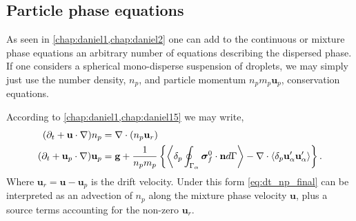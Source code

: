 \subsection{Particle phase equations}

As seen in \ref{chap:daniel1,chap:daniel2} one can add to the continuous or mixture phase equations an arbitrary number of equations describing the dispersed phase. 
If one considers a spherical mono-disperse suspension of droplets, we may simply just use the number density, $n_p$, and particle momentum $n_pm_p \textbf{u}_p$, conservation equations. 

According to \ref{chap:daniel1,chap:daniel15} we may write, 
\begin{align}
    (\pddt  
    + \textbf{u} \cdot\grad )n_p
    &= 
    \div (n_p\textbf{u}_r)
    \label{eq:dt_np_final}
    \\
    (\pddt + \textbf{u}_p \cdot \grad)  \textbf{u}_p
    &= 
    \textbf{g}
    + \frac{1}{n_pm_p}\left\{
        \pSavg{\bm\sigma_f^0 \cdot \textbf{n}}
        - \div \pavg{\textbf{u}_\alpha'\textbf{u}_\alpha'}
    \right\}.
    \label{eq:dt_up_final}
\end{align}
Where $\textbf{u}_r = \textbf{u} - \textbf{u}_p$ is the drift velocity. 
Under this form \ref{eq:dt_np_final} can be interpreted as an advection of $n_p$ along the mixture phase velocity $\textbf{u}$, plus a source terms accounting for the non-zero $\textbf{u}_r$. 





